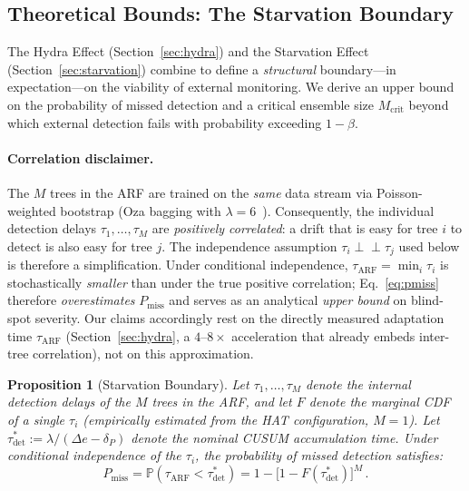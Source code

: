 \documentclass[10pt,conference]{IEEEtran}
\newtheorem{proposition}[theorem]{Proposition}
\theoremstyle{definition}
\begin{document}
\subsection{Theoretical Bounds: The Starvation Boundary}\label{sec:starvation_boundary}

The Hydra Effect (Section~\ref{sec:hydra}) and the Starvation Effect (Section~\ref{sec:starvation}) combine to define a \emph{structural} boundary---in expectation---on the viability of external monitoring.
We derive an upper bound on the probability of missed detection and a critical ensemble size $M_{\mathrm{crit}}$ beyond which external detection fails with probability exceeding $1 - \beta$.

\paragraph{Correlation disclaimer.}
The $M$ trees in the ARF are trained on the \emph{same} data stream via Poisson-weighted bootstrap (Oza bagging with $\lambda = 6$~\cite{gomes_arf_2017}).
Consequently, the individual detection delays $\tau_1, \ldots, \tau_M$ are \emph{positively correlated}: a drift that is easy for tree $i$ to detect is also easy for tree $j$.
The independence assumption $\tau_i \perp\!\!\!\perp \tau_j$ used below is therefore a simplification.
Under conditional independence, $\tau_{\mathrm{ARF}} = \min_i \tau_i$ is stochastically \emph{smaller} than under the true positive correlation; Eq.~\eqref{eq:pmiss} therefore \emph{overestimates} $P_{\mathrm{miss}}$ and serves as an analytical \emph{upper bound} on blind-spot severity. Our claims accordingly rest on the directly measured adaptation time $\tau_{\mathrm{ARF}}$ (Section~\ref{sec:hydra}, a $4$--$8\times$ acceleration that already embeds inter-tree correlation), not on this approximation.

\begin{proposition}[Starvation Boundary]\label{prop:starvation_boundary}
  Let $\tau_1, \ldots, \tau_M$ denote the internal detection delays of the $M$ trees in the ARF, and let $F$ denote the marginal CDF of a single $\tau_i$ (empirically estimated from the HAT configuration, $M = 1$).
  Let $\tau_{\mathrm{det}}^* := \lambda / (\Delta e - \delta_P)$ denote the nominal CUSUM accumulation time.
  Under conditional independence of the $\tau_i$, the probability of missed detection satisfies:
  \begin{equation}\label{eq:pmiss}
    P_{\mathrm{miss}} = \mathbb{P}\!\left(\tau_{\mathrm{ARF}} < \tau_{\mathrm{det}}^*\right) = 1 - \bigl[1 - F(\tau_{\mathrm{det}}^*)\bigr]^M\,.
  \end{equation}
\end{proposition}
\end{document}
